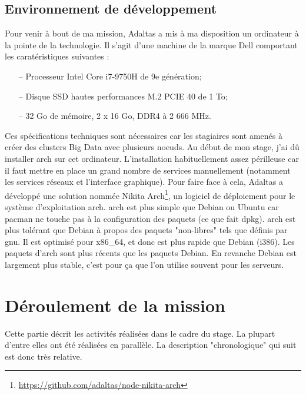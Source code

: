 \documentclass[12pt, french]{report}
\begin{document}
\section{Environnement de développement}

Pour venir à bout de ma mission, Adaltas a mis à ma disposition un ordinateur à la pointe de la technologie. Il s'agit d'une machine de la marque Dell comportant les caratéristiques suivantes :

\begin{itemize}
  \item[--] Processeur Intel Core i7-9750H de 9e génération;
  \item[--] Disque SSD hautes performances M.2 PCIE 40 de 1 To;
  \item[--] 32 Go de mémoire, 2 x 16 Go, DDR4 à 2 666 MHz.\\
\end{itemize}

Ces spécifications techniques sont nécessaires car les stagiaires sont amenés à créer des clusters Big Data avec plusieurs noeuds. Au début de mon stage, j’ai dû installer \gls{arch} sur cet ordinateur. L’installation  habituellement assez périlleuse car il faut mettre en place un grand nombre de services manuellement (notamment les services réseaux et l’interface graphique). Pour faire face à cela, Adaltas a développé une solution nommée Nikita Arch\footnote{\href{https://github.com/adaltas/node-nikita-arch}{https://github.com/adaltas/node-nikita-arch}}, un logiciel de déploiement pour le système d'exploitation \gls{arch}. \gls{arch} est plus simple que Debian ou Ubuntu car \gls{pacman} ne touche pas à la configuration des paquets (ce que fait \gls{dpkg}). \gls{arch} est plus tolérant que Debian à propos des paquets "non-libres" tels que définis par \gls{gnu}. Il est optimisé pour x86\_64, et donc est plus rapide que Debian (i386). Les paquets d'\gls{arch} sont plus récents que les paquets Debian. En revanche Debian est largement plus stable, c'est pour ça que l'on utilise souvent pour les serveurs.

\chapter{Déroulement de la mission}

Cette partie décrit les activités réalisées dans le cadre du stage. La plupart d'entre elles ont été réalisées en parallèle. La description "chronologique" qui suit est donc très relative.
\end{document}

